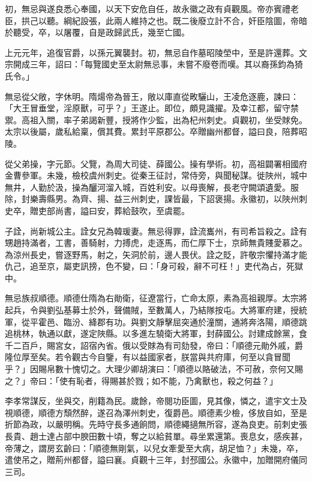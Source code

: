 \begin{pinyinscope}
 初，無忌與遂良悉心奉國，以天下安危自任，故永徽之政有貞觀風。帝亦賓禮老臣，拱己以聽。綱紀設張，此兩人維持之也。既二後廢立計不合，奸臣陰圖，帝暗於聽受，卒，以屠覆，自是政歸武氏，幾至亡國。



 上元元年，追復官爵，以孫元翼襲封。初，無忌自作墓昭陵塋中，至是許還葬。文宗開成三年，詔曰：「每覽國史至太尉無忌事，未嘗不廢卷而嘆。其以裔孫鈞為猗氏令。」



 無忌從父敞，字休明。隋煬帝為晉王，敞以庫直從畋驪山，王凌危逐鹿，諫曰：「大王冒垂堂，淫原獸，可乎？」王遂止。即位，頗見識擢。及幸江都，留守禁禦。高祖入關，率子弟謁新豐，授將作少監，出為杞州刺史。貞觀初，坐受賕免。太宗以後屬，歲私給稟，償其費。累封平原郡公。卒贈幽州都督，謚曰良，陪葬昭陵。



 從父弟操，字元節。父覽，為周大司徒、薛國公。操有學術。初，高祖闢署相國府金曹參軍。未幾，檢校虞州刺史。從秦王征討，常侍旁，與聞秘謀。徙陜州，城中無井，人勤於汲，操為釃河溜入城，百姓利安。以母喪解，長老守闕頌遺愛。服除，封樂壽縣男。為齊、揚、益三州刺史，課皆最，下詔褒揚。永徽初，以陜州刺史卒，贈吏部尚書，謚曰安，葬給鼓吹，至虞罷。



 子詮，尚新城公主。詮女兄為韓瑗妻。無忌得罪，詮流巂州，有司希旨殺之。詮有甥趙持滿者，工書，善騎射，力搏虎，走逐馬，而仁厚下士，京師無貴賤愛慕之。為涼州長史，嘗逐野馬，射之，矢洞於前，邊人畏伏。詮之貶，許敬宗懼持滿才能仇己，追至京，屬吏訊搒，色不變，曰：「身可殺，辭不可枉！」吏代為占，死獄中。



 無忌族叔順德。順德仕隋為右勛衛，征遼當行，亡命太原，素為高祖親厚。太宗將起兵，令與劉弘基募士於外，聲備賊，至數萬人，乃結隊按屯。大將軍府建，授統軍，從平霍邑、臨汾、絳郡有功。與劉文靜擊屈突通於潼關，通將奔洛陽，順德跳追桃林，執通以獻，遂定陜縣。以多進左驍衛大將軍，封薛國公。討建成餘黨，食千二百戶，賜宮女，詔宿內省。俄以受賕為有司劾發，帝曰：「順德元勛外戚，爵隆位厚至矣。若令觀古今自鑒，有以益國家者，朕當與共府庫，何至以貪冒聞乎？」因賜帛數十愧切之。大理少卿胡演曰：「順德以賂破法，不可赦，奈何又賜之？」帝曰：「使有恥者，得賜甚於戮；如不能，乃禽獸也，殺之何益？」



 李孝常謀反，坐與交，削籍為民。歲餘，帝閱功臣圖，見其像，憐之，遣宇文士及視順德，順德方頹然醉，遂召為澤州刺史，復爵邑。順德素少檢，侈放自如，至是折節為政，以嚴明稱。先時守長多通餉問，順德繩擿無所容，遂為良吏。前刺史張長貴、趙士達占部中腴田數十頃，奪之以給貧單。尋坐累還第。喪息女，感疾甚，帝薄之，謂房玄齡曰：「順德無剛氣，以兒女牽愛至大病，胡足恤？」未幾，卒，遣使吊之，贈荊州都督，謚曰襄。貞觀十三年，封邳國公。永徽中，加贈開府儀同三司。




\end{pinyinscope}
